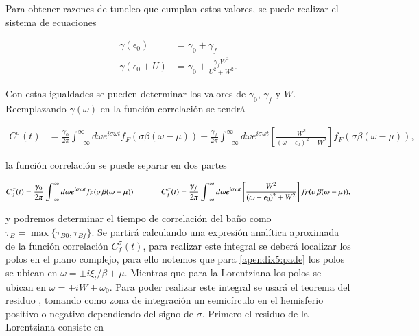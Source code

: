 \begin{appendixs}

Para obtener razones de tuneleo que cumplan estos valores, se puede realizar el sistema de ecuaciones 

\begin{align*}
    \gamma(\epsilon_{0}) & = \gamma_{0} + \gamma_{f} \\
    \gamma(\epsilon_{0} + U) & = \gamma_{0} + \frac{\gamma_{f} W^{2} }{U^{2} + W^{2}}.
\end{align*}

Con estas igualdades se pueden determinar los valores de $\gamma_{0}$, $\gamma_{f}$ y $W$. Reemplazando $\gamma(\omega)$ en la función correlación se tendrá

\begin{align*}
    C^{\sigma}(t) & = \frac{\gamma_{0}}{2\pi} \int_{-\infty}^{\infty}d\omega e^{i\sigma \omega t} f_{F}(\sigma \beta (\omega-\mu)) + \frac{\gamma_{f}}{2\pi} \int_{-\infty}^{\infty}d\omega e^{i\sigma \omega t}\left[ \frac{W^{2}}{(\omega-\epsilon_{0})^{2} + W^{2}} \right] f_{F}(\sigma \beta (\omega-\mu)),
\end{align*}

la función correlación se puede separar en dos partes

\begin{equation*}
    C^{\sigma}_{0}(t) = \frac{\gamma_{0}}{2\pi} \int_{-\infty}^{\infty}d\omega e^{i\sigma \omega t} f_{F}(\sigma \beta (\omega-\mu)) \hspace{12mm} C^{\sigma}_{f}(t) = \frac{\gamma_{f}}{2\pi} \int_{-\infty}^{\infty}d\omega e^{i\sigma \omega t}\left[ \frac{W^{2}}{(\omega-\epsilon_{0})^{2} + W^{2}} \right] f_{F}(\sigma \beta (\omega-\mu)),
\end{equation*}

y podremos determinar el tiempo de correlación del baño como $\tau_{B} = \max\{\tau_{B0},\tau_{Bf}\}$. Se partirá calculando una expresión analítica aproximada de la función correlación $C^{\sigma}_{f}(t)$, para realizar este integral se deberá localizar los polos en el plano complejo, para ello notemos que para \ref{apendix5:pade} los polos se ubican en $\omega = \pm i \xi_{l}/\beta + \mu $. Mientras que para la Lorentziana los polos se ubican en $\omega = \pm i W + \omega_{0}$. Para poder realizar este integral se usará el teorema del residuo \cite{riley2006mathematical}, tomando como zona de integración un semicírculo en el hemisferio positivo o negativo dependiendo del signo de $\sigma$. Primero el residuo de la Lorentziana consiste en 


\end{appendixs}
